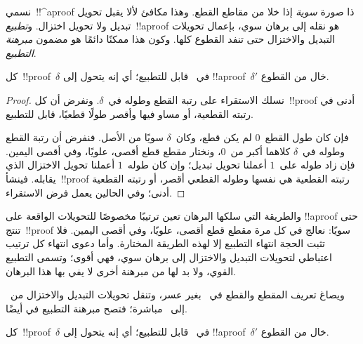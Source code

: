 \documentclass[../../../include/open-logic-section]{subfiles}
\begin{document}


نسمي~!!^a{proof} ذا صورة \emph{سوية} إذا خلا من مقاطع القطع. وهذا مكافئ
لألا يقبل تحويل تبديل ولا تحويل اختزال. و\emph{تطبيع}~!!a{proof} هو
نقله إلى برهان سوي، بإعمال تحويلات التبديل والاختزال حتى تنفد القطوع
كلها. وكون هذا ممكنًا دائمًا هو مضمون \emph{مبرهنة التطبيع}.

\begin{thm}
كل~!!{proof}~$\delta$ في~ قابل للتطبيع؛ أي إنه يتحول إلى
!!a{proof}~$\delta'$ خال من القطوع.
\end{thm}

\begin{proof}
  نسلك الاستقراء على رتبة القطع وطوله في~$\delta$. ونفرض أن كل~!!{proof}
  أدنى في رتبته القطعية، أو مساو فيها وأقصر طولًا قطعيًا، قابل للتطبيع.

  فإن كان طول القطع~$0$ لم يكن قطع، وكان~$\delta$ سويًا من الأصل. فنفرض
  أن رتبة القطع وطوله في~$\delta$ كلاهما أكبر من~$0$، ونختار مقطع قطع
  أقصى، علويًا، وفي أقصى اليمين. فإن زاد طوله على~$1$ أعملنا تحويل تبديل؛
  وإن كان طوله~$1$ أعملنا تحويل الاختزال الذي يقابله. فينشأ~!!{proof}
  رتبته القطعية هي نفسها وطوله القطعي أقصر، أو رتبته القطعية أدنى؛ وفي
  الحالين يعمل فرض الاستقراء.
\end{proof}

والطريقة التي سلكها البرهان تعين ترتيبًا مخصوصًا للتحويلات الواقعة على
!!a{proof} حتى تنتج~!!{proof} سويًا: نعالج في كل مرة مقطع قطع أقصى،
علويًا، وفي أقصى اليمين. فلا تثبت الحجة انتهاء التطبيع إلا لهذه الطريقة
المختارة. وأما دعوى انتهاء كل ترتيب اعتباطي لتحويلات التبديل والاختزال
إلى برهان سوي، فهي أقوى؛ وتسمى التطبيع القوي، ولا بد لها من مبرهنة أخرى
لا يفي بها هذا البرهان.

ويصاغ تعريف المقطع والقطع في~ بغير عسر، وتنقل تحويلات التبديل
والاختزال من~ إلى~ مباشرة؛ فتصح مبرهنة التطبيع في
 أيضًا.

\begin{thm}
كل~!!{proof}~$\delta$ في~ قابل للتطبيع؛ أي إنه يتحول إلى
!!a{proof}~$\delta'$ خال من القطوع.
\end{thm}
\end{document}
